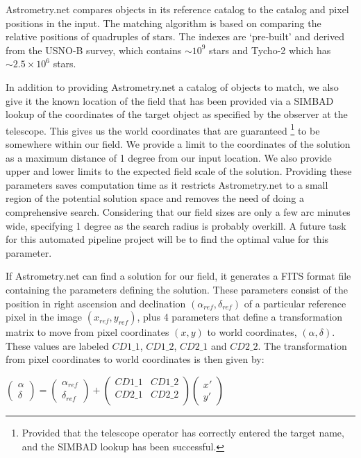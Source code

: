 Astrometry.net compares objects in its reference catalog to the catalog and pixel positions in the input. The matching algorithm is based on comparing the relative positions of quadruples of stars. The indexes are `pre-built' and derived from the USNO-B survey, which contains $\sim10^9$ stars and Tycho-2 which has $\sim2.5\times10^6$ stars. 

In addition to providing Astrometry.net a catalog of objects to match, we also give it the known location of the field that has been provided via a SIMBAD lookup of the coordinates of the target object as specified by the observer at the telescope. This gives us the world coordinates that are guaranteed \footnote{Provided that the telescope operator has correctly entered the target name, and the SIMBAD lookup has been successful.} to be somewhere within our field. We provide a limit to the coordinates of the solution as a maximum distance of 1 degree from our input location. We also provide upper and lower limits to the expected field scale of the solution. Providing these parameters saves computation time as it restricts Astrometry.net to a small region of the potential solution space and removes the need of doing a comprehensive search. Considering that our field sizes are only a few arc minutes wide, specifying 1 degree as the search radius is probably overkill. A future task for this automated pipeline project will be to find the optimal value for this parameter.

If Astrometry.net can find a solution for our field, it generates a FITS format file containing the parameters defining the solution. These parameters consist of the position in right ascension and declination $(\alpha_{ref}, \delta_{ref})$ of a particular reference pixel in the image $(x_{ref}, y_{ref})$, plus 4 parameters that define a transformation matrix to move from pixel coordinates $(x, y)$ to world coordinates, $(\alpha, \delta)$. These values are labeled $CD1\_1$, $CD1\_2$, $CD2\_1$ and $CD2\_2$. The transformation from pixel coordinates to world coordinates is then given by: 

$\left(\begin{array}{c} \alpha \\ \delta \end{array} \right) = \left(\begin{array}{c} \alpha_{ref} \\ \delta_{ref} \end{array} \right) + 
\left(\begin{array}{cc}  CD1\_1 & CD1\_2 \\ CD2\_1  & CD2\_2 \\ \end{array}\right) 
\left(\begin{array}{c} x' \\ y' \end{array} \right)$

